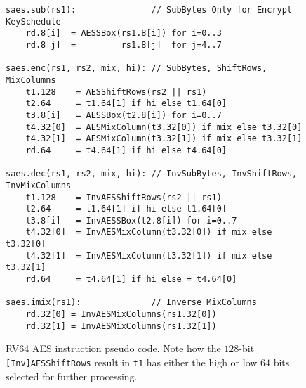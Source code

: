 \begin{figure}
\begin{lstlisting}[language=pseudo]
saes.sub(rs1):               // SubBytes Only for Encrypt KeySchedule
    rd.8[i]  = AESSBox(rs1.8[i]) for i=0..3
    rd.8[j]  =         rs1.8[j]  for j=4..7

saes.enc(rs1, rs2, mix, hi): // SubBytes, ShiftRows, MixColumns
    t1.128    = AESShiftRows(rs2 || rs1)
    t2.64     = t1.64[1] if hi else t1.64[0]
    t3.8[i]   = AESSBox(t2.8[i]) for i=0..7
    t4.32[0]  = AESMixColumn(t3.32[0]) if mix else t3.32[0]
    t4.32[1]  = AESMixColumn(t3.32[1]) if mix else t3.32[1]
    rd.64     = t4.64[1] if hi else t4.64[0]

saes.dec(rs1, rs2, mix, hi): // InvSubBytes, InvShiftRows, InvMixColumns
    t1.128    = InvAESShiftRows(rs2 || rs1)
    t2.64     = t1.64[1] if hi else t1.64[0]
    t3.8[i]   = InvAESSBox(t2.8[i]) for i=0..7
    t4.32[0]  = InvAESMixColumn(t3.32[0]) if mix else t3.32[0]
    t4.32[1]  = InvAESMixColumn(t3.32[1]) if mix else t3.32[1]
    rd.64     = t4.64[1] if hi else = t4.64[0]

saes.imix(rs1):              // Inverse MixColumns
    rd.32[0] = InvAESMixColumns(rs1.32[0])
    rd.32[1] = InvAESMixColumns(rs1.32[1])
\end{lstlisting}
\caption{
RV64 AES instruction pseudo code.
Note how the $128$-bit {\tt [Inv]AESShiftRows} result in {\tt t1} has
either the high or low $64$ bits selected for further processing.
}
\label{fig:pesudo:aes:rv64}
\end{figure}

